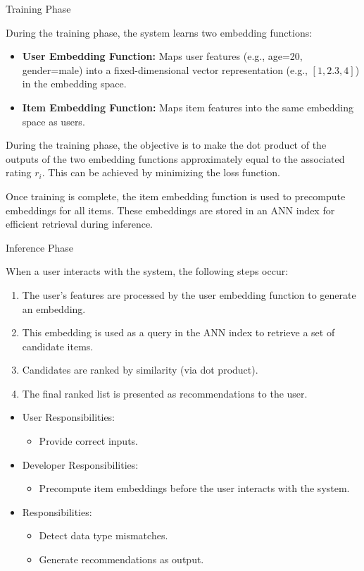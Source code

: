 \documentclass[12pt]{article}
\begin{document}
Training Phase

During the training phase, the system learns two embedding functions:

\begin{itemize}
    \item \textbf{User Embedding Function:} Maps user features (e.g., age=20, gender=male) into a fixed-dimensional vector representation (e.g., $[1,2.3,4]$) in the embedding space.
    \item \textbf{Item Embedding Function:} Maps item features into the same embedding space as users.
\end{itemize}
During the training phase, the objective is to make the dot product of the outputs of the two embedding functions approximately equal to the associated rating $r_i$. This can be achieved by minimizing the loss function.

Once training is complete, the item embedding function is used to precompute embeddings for all items. These embeddings are stored in an ANN index for efficient retrieval during inference.

Inference Phase

When a user interacts with the system, the following steps occur:

\begin{enumerate}
    \item The user's features are processed by the user embedding function to generate an embedding.
    \item This embedding is used as a query in the ANN index to retrieve a set of candidate items.
    \item Candidates are ranked by similarity (via dot product).
    \item The final ranked list is presented as recommendations to the user.
\end{enumerate}

\begin{itemize}
  \item User Responsibilities:
  \begin{itemize}
  \item Provide correct inputs.
  \end{itemize}
  \item Developer Responsibilities:
  \begin{itemize}
  \item Precompute item embeddings before the user interacts with the system.
  \end{itemize}
  \item \progname{} Responsibilities:
  \begin{itemize}
  \item Detect data type mismatches.
  \item Generate recommendations as output.
  \end{itemize}
\end{itemize}
  
\end{document}
